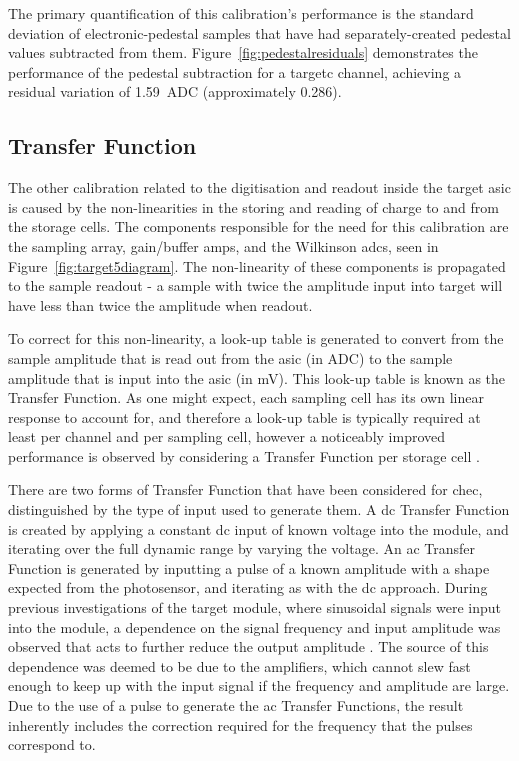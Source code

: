 The primary quantification of this calibration's performance is the standard deviation of electronic-pedestal samples that have had separately-created pedestal values subtracted from them. Figure~\ref{fig:pedestalresiduals} demonstrates the performance of the pedestal subtraction for a \gls{targetc} channel, achieving a residual variation of \SI{1.59}{ADC} (approximately \SI{0.286}{\pe}).

\subsection{Transfer Function}

The other calibration related to the digitisation and readout inside the \gls{target} \gls{asic} is caused by the non-linearities in the storing and reading of charge to and from the storage cells. The components responsible for the need for this calibration are the sampling array, gain/buffer amps, and the Wilkinson \glspl{adc}, seen in Figure~\ref{fig:target5diagram}. The non-linearity of these components is propagated to the sample readout - a sample with twice the amplitude input into \gls{target} will have less than twice the amplitude when readout.

To correct for this non-linearity, a look-up table is generated to convert from the sample amplitude that is read out from the \gls{asic} (in \si{ADC}) to the sample amplitude that is input into the \gls{asic} (in \si{mV}). This look-up table is known as the Transfer Function. As one might expect, each sampling cell has its own linear response to account for, and therefore a look-up table is typically required at least per channel and per sampling cell, however a noticeably improved performance is observed by considering a Transfer Function per storage cell .

There are two forms of Transfer Function that have been considered for \gls{chec}, distinguished by the type of input used to generate them. A \gls{dc} Transfer Function is created by applying a constant \gls{dc} input of known voltage into the module, and iterating over the full dynamic range by varying the voltage. An \gls{ac} Transfer Function is generated by inputting a pulse of a known amplitude with a shape expected from the photosensor, and iterating as with the \gls{dc} approach. During previous investigations of the \gls{target} module, where sinusoidal signals were input into the module, a dependence on the signal frequency and input amplitude was observed that acts to further reduce the output amplitude \cite{Bechtol2012}\cite{Albert2017}. The source of this dependence was deemed to be due to the amplifiers, which cannot slew fast enough to keep up with the input signal if the frequency and amplitude are large. Due to the use of a pulse to generate the \gls{ac} Transfer Functions, the result inherently includes the correction required for the frequency that the pulses correspond to. 

